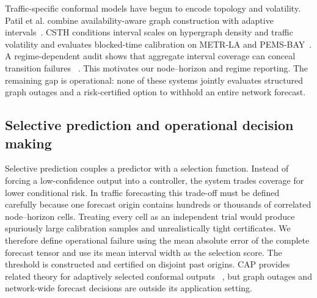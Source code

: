\documentclass[pdflatex,sn-mathphys-num]{sn-jnl}
\begin{document}
Traffic-specific conformal models have begun to encode topology and volatility.
Patil et al. combine availability-aware graph construction with adaptive
intervals~\cite{patil2024conformal}. CSTH conditions interval scales on
hypergraph density and traffic volatility and evaluates blocked-time
calibration on METR-LA and PEMS-BAY~\cite{wang2026csth}. A regime-dependent
audit shows that aggregate interval coverage can conceal transition failures
~\cite{wang2026regime}. This motivates our node--horizon and regime reporting.
The remaining gap is operational: none of these systems jointly evaluates
structured graph outages and a risk-certified option to withhold an entire
network forecast.

\subsection{Selective prediction and operational decision making}
Selective prediction couples a predictor with a selection function. Instead of
forcing a low-confidence output into a controller, the system trades coverage
for lower conditional risk. In traffic forecasting this trade-off must be
defined carefully because one forecast origin contains hundreds or thousands
of correlated node--horizon cells. Treating every cell as an independent trial
would produce spuriously large calibration samples and unrealistically tight
certificates. We therefore define operational failure using the mean absolute
error of the complete forecast tensor and use its mean interval width as the
selection score. The threshold is constructed and certified on disjoint past
origins. CAP provides related theory for adaptively selected conformal outputs
~\cite{bao2025cap}, but graph outages and network-wide forecast decisions are
outside its application setting.
\end{document}
